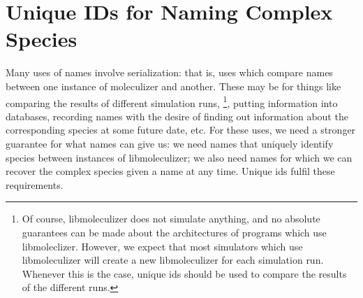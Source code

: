\section{Unique IDs for Naming Complex Species}
Many uses of names involve serialization: that is, uses which
compare names between one instance of moleculizer and another.  These
may be for things like comparing the results of different simulation
runs, \footnote{Of course, libmoleculizer does not simulate anything,
  and no absolute guarantees can be made about the architectures of
  programs which use libmoleclizer.  However, we expect that most
  simulators which use libmoleculizer will create a new libmoleculizer
  for each simulation run.  Whenever this is the case, unique ids
  should be used to compare the results of the different runs.},
putting information into databases, recording names with the desire of
finding out information about the corresponding species at some future
date, etc.  For these uses, we need a stronger guarantee for what
names can give us: we need names that uniquely identify species
between instances of libmoleculizer; we also need names for which we
can recover the complex species given a name at any time.  Unique ids
fulfil these requirements.  

